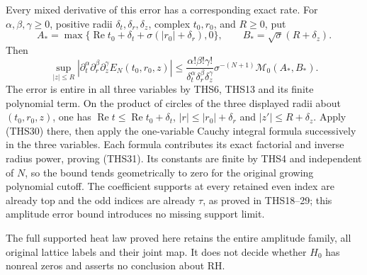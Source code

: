 Every mixed derivative of this error has a corresponding exact
rate. For $\alpha,\beta,\gamma\ge0$, positive radii
$\delta_t,\delta_r,\delta_z$, complex $t_0,r_0$, and $R\ge0$,
put
\[
 A_*=\max\{\operatorname{Re}t_0+\delta_t
                 +\sigma(|r_0|+\delta_r),0\},\qquad
 B_*=\sqrt\sigma(R+\delta_z).
\]
Then
\begin{equation}\tag{THS31}
 \sup_{|z|\le R}
 |\partial_t^\alpha\partial_r^\beta\partial_z^\gamma
                  E_N(t_0,r_0,z)|
 \le
 \frac{\alpha!\beta!\gamma!}
      {\delta_t^\alpha\delta_r^\beta\delta_z^\gamma}
       \sigma^{-(N+1)}\mathcal M_0(A_*,B_*).
\end{equation}
The error is entire in all three variables by THS6, THS13
and its finite polynomial term. On the product of circles of
the three displayed radii about $(t_0,r_0,z)$, one has
$\operatorname{Re}t\le\operatorname{Re}t_0+\delta_t$,
$|r|\le|r_0|+\delta_r$ and $|z'|\le R+\delta_z$.
Apply (THS30) there, then apply the one-variable Cauchy
integral formula successively in the three variables. Each
formula contributes its exact factorial and inverse radius
power, proving (THS31). Its constants are finite by THS4 and
independent of $N$, so the bound tends geometrically to zero
for the original growing polynomial cutoff. The coefficient
supports at every retained even index are already top and
the odd indices are already $\tau$, as proved in THS18--29;
this amplitude error bound introduces no missing support limit.

The full supported heat law proved here retains the entire
amplitude family, all original lattice labels and their joint
map. It does not decide whether $H_0$ has nonreal zeros and
asserts no conclusion about RH.

